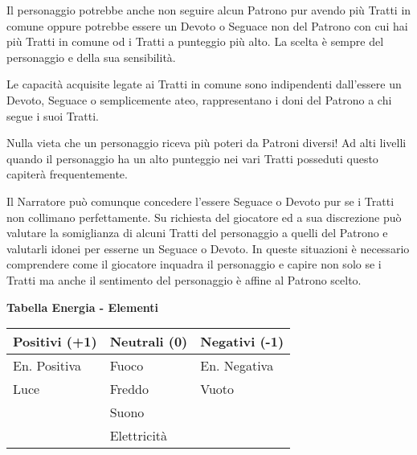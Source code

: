 \begin{multicols}{2}
Il personaggio potrebbe anche non seguire alcun Patrono pur avendo più Tratti in comune oppure potrebbe essere un Devoto o Seguace non del Patrono con cui hai più Tratti in comune od i Tratti a punteggio più alto. La scelta è sempre del personaggio e della sua sensibilità.

Le capacità acquisite legate ai Tratti in comune sono indipendenti dall'essere un Devoto, Seguace o semplicemente ateo, rappresentano i doni del Patrono a chi segue i suoi Tratti.

Nulla vieta che un personaggio riceva più poteri da Patroni diversi! Ad alti livelli quando il personaggio ha un alto punteggio nei vari Tratti posseduti questo capiterà frequentemente.  

\begin{changemargin}{0.3cm}{0.3cm}\begin{narratore}
Il Narratore può comunque concedere l'essere Seguace o Devoto pur se i Tratti non collimano perfettamente. Su richiesta del giocatore ed a sua discrezione può valutare la somiglianza di alcuni Tratti del personaggio a quelli del Patrono e valutarli idonei per esserne un Seguace o Devoto. In queste situazioni è necessario comprendere come il giocatore inquadra il personaggio e capire non solo se i Tratti ma anche il sentimento del personaggio è affine al Patrono scelto.
\end{narratore}\end{changemargin}




\medskip

\textbf{Tabella Energia - Elementi}

\medskip

\begin{tabular}{lll}
\textbf{Positivi} (+1) & \textbf{Neutrali} (0) & \textbf{Negativi} (-1)\\
\toprule
En. Positiva& Fuoco& En. Negativa\\
Luce & Freddo& Vuoto\\
& Suono & \\
& Elettricità & 
\end{tabular}


\end{multicols}

